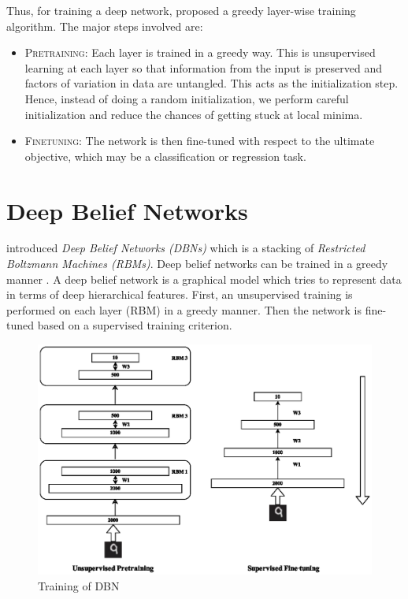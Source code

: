 Thus, for training a deep network, \citet{hinton2006reducing} proposed a greedy layer-wise training algorithm.  The major steps involved are:
\begin{itemize}
\item \textsc{Pretraining}: Each layer is trained in a greedy way.  This is unsupervised learning at each layer so that information from the input is preserved and factors of variation in data are untangled.  This acts as the initialization step.  Hence, instead of doing a random initialization, we perform careful initialization and reduce the chances of getting stuck at local minima.
\item \textsc{Finetuning}: The network is then fine-tuned with respect to the ultimate objective, which may be a classification or regression task.
\end{itemize}

\section{Deep Belief Networks}
\citet{hinton2006reducing} introduced \emph{Deep Belief Networks (DBNs)} which is a stacking of \emph{Restricted Boltzmann Machines (RBMs)}.  Deep belief networks can be trained in a greedy manner \cite{hinton2006reducing}.  A deep belief network is a graphical model which tries to represent data in terms of deep hierarchical features.  First, an unsupervised training is performed on each layer (RBM) in a greedy manner.  Then the network is fine-tuned based on a supervised training criterion.\\
\begin{figure}[!ht]
\centering
\includegraphics[width=1\textwidth]{./imgs/RBM_Train.eps} 
\caption{Training of DBN}
\end{figure}

